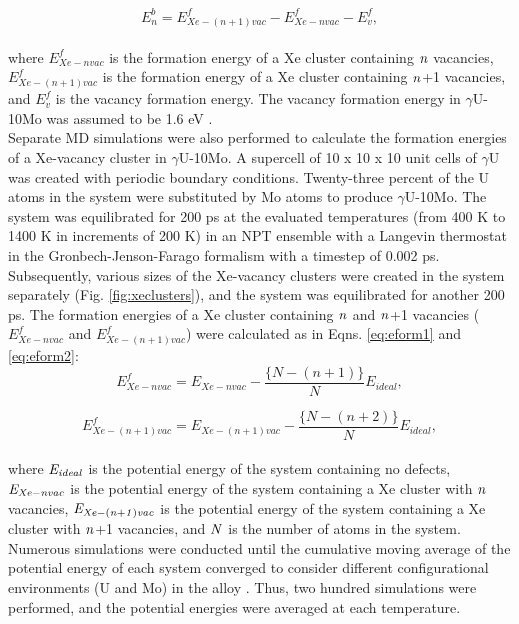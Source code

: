 \documentclass[preprint,12pt]{elsarticle}
\begin{document}
\begin{equation}
\label{eq:be}
E^{b}_{n} = E^{f}_{Xe-(n+1)vac} - E^{f}_{Xe-nvac} - E^{f}_{v},
\end{equation}
\\
\noindent where $E^{f}_{Xe-nvac}$ is the formation energy of a Xe cluster containing $\it{n}$ vacancies, $E^{f}_{Xe-(n+1)vac}$ is the formation energy of a Xe cluster containing $\it{n}$+1 vacancies, and $E^{f}_{v}$ is the vacancy formation energy. The vacancy formation energy in $\gamma$U-10Mo was assumed to be 1.6 eV \cite{beeler2020improved}.\\ 
\indent Separate MD simulations were also performed to calculate the formation energies of a Xe-vacancy cluster in $\gamma$U-10Mo. A supercell of 10 x 10 x 10 unit cells of $\gamma$U was created with periodic boundary conditions. Twenty-three percent of the U atoms in the system were substituted by Mo atoms to produce $\gamma$U-10Mo. The system was equilibrated for 200 ps at the evaluated temperatures (from 400 K to 1400 K in increments of 200 K) in an NPT ensemble with a Langevin thermostat in the Gronbech-Jenson-Farago formalism \cite{gronbech2013simple, gronbech2014application} with a timestep of 0.002 ps. Subsequently, various sizes of the Xe-vacancy clusters were created in the system separately (Fig. \ref{fig:xeclusters}), and the system was equilibrated for another 200 ps. The formation energies of a Xe cluster containing $\it{n}$ and $\it{n}$+1 vacancies ($E_{Xe-nvac}^{f}$ and $E_{Xe-(n+1)vac}^{f}$) were calculated as in Eqns. \ref{eq:eform1} and \ref{eq:eform2}:\\

\begin{equation}
\label{eq:eform1}
E_{Xe-nvac}^{f} = E_{Xe-nvac} - \frac{\{N-(n+1)\}}{N}E_{ideal}, 
\end{equation}

\begin{equation}
\label{eq:eform2}
E_{Xe-(n+1)vac}^{f} = E_{Xe-(n+1)vac} - \frac{\{N-(n+2)\}}{N}E_{ideal}, 
\end{equation}
\\
\noindent where $\it{E}_{ideal}$ is the potential energy of the system containing no defects, $\it{E}_{Xe-nvac}$ is the potential energy of the system containing a Xe cluster with $\it{n}$ vacancies, $\it{E}_{Xe-(n+1)vac}$ is the potential energy of the system containing a Xe cluster with $\it{n}$+1 vacancies, and $\it{N}$ is the number of atoms in the system. Numerous simulations were conducted until the cumulative moving average of the potential energy of each system converged to consider different configurational environments (U and Mo) in the alloy \cite{park2021atomistic}. Thus, two hundred simulations were performed, and the potential energies were averaged at each temperature.
\\
\end{document}

